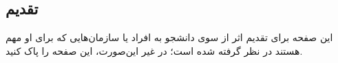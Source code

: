 \titlepageParsi
\cleardoublepage

\clearpage

\begin{center}
    \section*{تقدیم}
\end{center}
این صفحه برای تقدیم اثر از سوی دانشجو به افراد یا سازمان‌هایی که برای او مهم هستند در نظر گرفته شده است؛ در غیر این‌صورت، این صفحه را پاک کنید.
\clearpage
